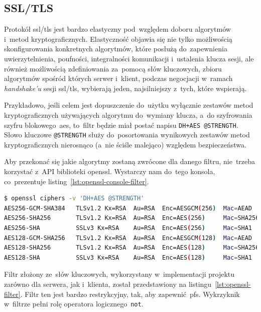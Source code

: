 \documentclass[thesis]{subfiles}
\begin{document}

\subsection{SSL/TLS}
\label{subsec:ssl-tls}

Protokół \gls{ssl/tls} jest bardzo elastyczny pod~względem doboru algorytmów i~metod kryptograficznych. Elastyczność objawia się nie tylko możliwością skonfigurowania konkretnych algorytmów, które posłużą do~zapewnienia uwierzytelnienia, poufności, integralności komunikacji i~ustalenia klucza sesji, ale również możliwością zdefiniowania za~pomocą słów kluczowych, zbioru algorytmów spośród których serwer i~klient, podczas negocjacji w~ramach \emph{handshake'u} sesji \gls{ssl/tls}, wybierają jeden, najsilniejszy z~tych, które wspierają.

Przykładowo, jeśli celem jest dopuszczenie do~użytku wyłącznie zestawów metod kryptograficznych używających algorytmu  do~wymiany klucza, a~do szyfrowania szyfru blokowego~\gls{aes}, to~filtr będzie miał postać napisu \texttt{DH+AES @STRENGTH}. Słowo kluczowe \texttt{@STRENGTH} służy do~posortowania wynikowych zestawów metod kryptograficznych nierosnąco (a~nie ściśle malejąco) względem bezpieczeństwa.

Aby przekonać się jakie algorytmy zostaną zwrócone dla danego filtru, nie~trzeba korzystać z~API biblioteki \gls{openssl}. Wystarczy nam do~tego konsola, co~prezentuje listing~\ref{lst:openssl-console-filter}.\\

\begin{lstlisting}[numbers=none,language=bash,caption={Wynik filtrowania zestawów algorytmów w~konsoli za~pomocą \gls{openssl}},label=lst:openssl-console-filter]
$ openssl ciphers -v 'DH+AES @STRENGTH'
AES256-GCM-SHA384   TLSv1.2 Kx=RSA  Au=RSA  Enc=AESGCM(256)  Mac=AEAD
AES256-SHA256       TLSv1.2 Kx=RSA  Au=RSA  Enc=AES(256)     Mac=SHA256
AES256-SHA          SSLv3 Kx=RSA    Au=RSA  Enc=AES(256)     Mac=SHA1
AES128-GCM-SHA256   TLSv1.2 Kx=RSA  Au=RSA  Enc=AESGCM(128)  Mac=AEAD
AES128-SHA256       TLSv1.2 Kx=RSA  Au=RSA  Enc=AES(128)     Mac=SHA256
AES128-SHA          SSLv3 Kx=RSA    Au=RSA  Enc=AES(128)     Mac=SHA1
\end{lstlisting}

Filtr złożony ze~słów kluczowych, wykorzystany w~implementacji projektu zarówno dla serwera, jak i~klienta, został przedstawiony na listingu~\ref{lst:openssl-filter}. Filtr ten jest bardzo restrykcyjny, tak, aby zapewnić~\gls{pfs}. Wykrzyknik w~filtrze pełni rolę operatora logicznego~\texttt{not}.\\
\end{document}
